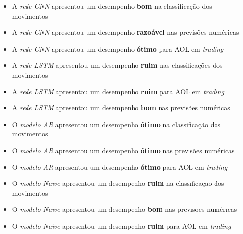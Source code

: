 \begin{itemize}
    
    \item{A \textit{rede CNN} apresentou um desempenho \textbf{bom} na classificação dos movimentos}
    \item{A \textit{rede CNN} apresentou um desempenho \textbf{razoável} nas previsões numéricas}
    \item{A \textit{rede CNN} apresentou um desempenho \textbf{ótimo} para AOL em \textit{trading}}
    \item{A \textit{rede LSTM} apresentou um desempenho \textbf{ruim} nas classificações dos movimentos}
    \item{A \textit{rede LSTM} apresentou um desempenho \textbf{ruim} para AOL em \textit{trading}}
    \item{A \textit{rede LSTM} apresentou um desempenho \textbf{bom} nas previsões numéricas}
    \item{O \textit{modelo AR} apresentou um desempenho \textbf{ótimo} na classificação dos movimentos}
    \item{O \textit{modelo AR} apresentou um desempenho \textbf{ótimo} nas previsões numéricas}
    \item{O \textit{modelo AR} apresentou um desempenho \textbf{ótimo} para AOL em \textit{trading}}
    \item{O \textit{modelo Naive} apresentou um desempenho \textbf{ruim} na classificação dos movimentos}
    \item{O \textit{modelo Naive} apresentou um desempenho \textbf{bom} nas previsões numéricas}
    \item{O \textit{modelo Naive} apresentou um desempenho \textbf{ruim} para AOL em \textit{trading}}
\end{itemize}